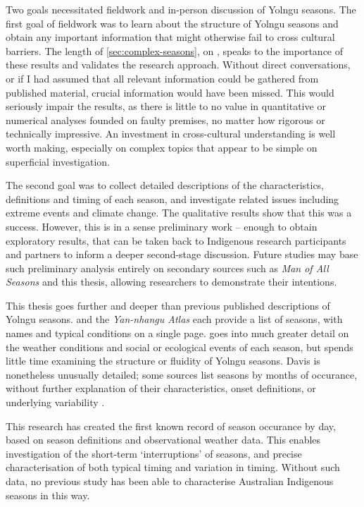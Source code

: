 Two goals necessitated fieldwork and in-person discussion of Yolngu seasons.
The first goal of fieldwork  was to learn about the structure of Yolngu
seasons and obtain any important information that might otherwise
fail to cross cultural barriers.  The length of \cref{sec:complex-seasons},
on \textit{}, speaks to the importance of these
results and validates the research approach.
%
Without direct conversations, or if I had assumed that all relevant information
could be gathered from published material, crucial information would have been
missed.  This would seriously impair the results, as there is little to no value
in quantitative or numerical analyses
founded on faulty premises, no matter how rigorous or technically impressive.
An investment in cross-cultural understanding is well worth making, especially
on complex topics that appear to be simple on superficial investigation.

The second goal was to collect detailed descriptions of the characteristics,
definitions and timing of each season, and investigate related issues
including extreme events and climate change.  The qualitative results
show that this was a success.  However, this is in a sense preliminary work --
enough to obtain exploratory results, that can be taken back to Indigenous
research participants and partners to inform a deeper second-stage discussion.  Future
studies may base such preliminary analysis entirely on secondary sources
such as \textit{Man of All Seasons} \citep{davis1989} and this thesis,
allowing researchers to demonstrate their intentions.


This thesis goes further and deeper than previous published descriptions of Yolngu seasons.
\citet{barber2005} and the \textit{Yan-nhangu Atlas} \citep{atlas2014} each
provide a list of seasons, with names and typical conditions on a single page.
\citet{davis1989} goes into much greater detail on the weather conditions and
social or ecological events of each season, but spends little time examining
the structure or fluidity of Yolngu seasons.  Davis is nonetheless unusually
detailed; some sources \citep[eg.][]{BOM-iwk} list seasons by months of
occurance, without further explanation of their characteristics,
onset definitions, or underlying variability .


This research has created the first known record of season occurance by day,
based on season definitions and observational weather data.  This enables
investigation of the short-term `interruptions' of seasons, and precise
characterisation of both typical timing and variation in timing.  Without
such data, no previous study \citep[eg.][]{davis1989,barber2005,CSIROcals,BOM-iwk}
has been able to characterise Australian Indigenous seasons in this way.



